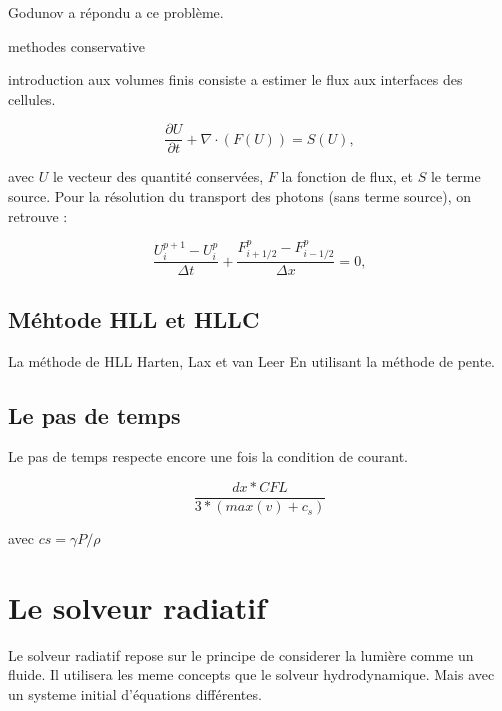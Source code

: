 Godunov  \cite{MR0119433} a répondu a ce problème.

methodes conservative

introduction aux volumes finis
consiste a estimer le flux aux interfaces des cellules.


\begin{equation}
 \frac{\partial U}{\partial t} + \nabla \cdot (F(U)) = S(U), 
\label{eq:rad_generale}
\end{equation}

avec $U$ le vecteur des quantité conservées, $F$ la fonction de flux, et $S$ le terme source. Pour la résolution du transport des photons (sans terme source), on retrouve :

\begin{equation}
\frac{ U^{p+1}_i - U^{p}_i }{\Delta t} + \frac{ F^{p}_{i
+1/2} - F^{p}_{i-1/2} }{\Delta x} =0,
\label{eq:rad_solver}
\end{equation}

\subsection{Méhtode HLL et HLLC }
La méthode de HLL Harten, Lax et van Leer 
En utilisant la méthode de pente.

\subsection{Le pas de temps}

Le pas de temps respecte encore une fois la condition de courant.

\begin{equation}
\frac{dx * CFL }{3*(max(v) + c_s)}
\end{equation}

avec $cs = \gamma P/\rho$

\section{Le solveur radiatif}

Le solveur radiatif repose sur le principe de considerer la lumière comme un fluide.
Il utilisera les meme concepts que le solveur hydrodynamique.
Mais avec un systeme initial d'équations différentes. 


